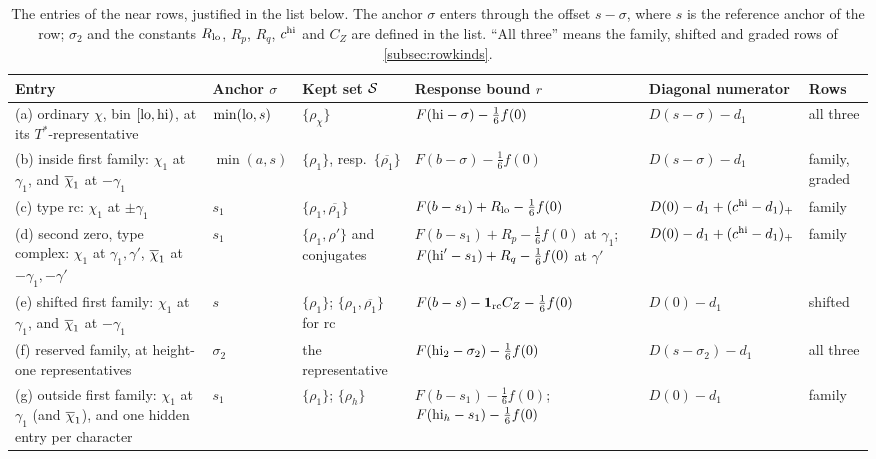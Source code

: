 \begin{table}[ht]
\centering
\footnotesize
\setlength{\tabcolsep}{3.5pt}
\renewcommand{\arraystretch}{1.3}
\begin{tabular}{@{}>{\raggedright\arraybackslash}p{3.45cm}>{\centering\arraybackslash}p{1.35cm}
  >{\centering\arraybackslash}p{1.75cm}>{\centering\arraybackslash}p{3.2cm}
  >{\centering\arraybackslash}p{2.35cm}>{\raggedright\arraybackslash}p{1.65cm}@{}}
\toprule
Entry & Anchor $\sigma$ & Kept set $\mathcal{S}$ & Response bound $r$ & Diagonal numerator & Rows\\
\midrule
(a) ordinary $\chi$, bin $[\mathrm{lo},\mathrm{hi})$, at its $T^*$-representative & $\min(\mathrm{lo},s)$ & $\{\rho_\chi\}$ &
  $F(\mathrm{hi}-\sigma)-\frac16f(0)$ & $D(s-\sigma)-d_1$ & all three\\
(b) inside first family: $\chi_1$ at $\gamma_1$, and $\overline{\chi}_1$ at $-\gamma_1$ & $\min(a,s)$ &
  $\{\rho_1\}$, resp.\ $\{\overline{\rho_1}\}$ & $F(b-\sigma)-\frac16f(0)$ & $D(s-\sigma)-d_1$ & family, graded\\
(c) type $\mathrm{rc}$: $\chi_1$ at $\pm\gamma_1$ & $s_1$ & $\{\rho_1,\overline{\rho_1}\}$ &
  $F(b-s_1)+R_{\mathrm{lo}}-\frac16f(0)$ & $D(0)-d_1+(c^{\mathrm{hi}}-d_1)_+$ & family\\
(d) second zero, type $\mathrm{complex}$: $\chi_1$ at $\gamma_1,\gamma'$, $\overline{\chi}_1$ at $-\gamma_1,-\gamma'$ &
  $s_1$ & $\{\rho_1,\rho'\}$ and conjugates & $F(b-s_1)+R_p-\frac16f(0)$ at $\gamma_1$;
  $F(\mathrm{hi}'-s_1)+R_q-\frac16f(0)$ at $\gamma'$ & $D(0)-d_1+(c^{\mathrm{hi}}-d_1)_+$ & family\\
(e) shifted first family: $\chi_1$ at $\gamma_1$, and $\overline{\chi}_1$ at $-\gamma_1$ & $s$ &
  $\{\rho_1\}$; $\{\rho_1,\overline{\rho_1}\}$ for $\mathrm{rc}$ & $F(b-s)-\mathbf{1}_{\mathrm{rc}}C_Z-\frac16f(0)$ &
  $D(0)-d_1$ & shifted\\
(f) reserved family, at height-one representatives & $\sigma_2$ & the representative &
  $F(\mathrm{hi}_2-\sigma_2)-\frac16f(0)$ & $D(s-\sigma_2)-d_1$ & all three\\
(g) outside first family: $\chi_1$ at $\gamma_1$ (and $\overline{\chi}_1$), and one hidden entry per character &
  $s_1$ & $\{\rho_1\}$; $\{\rho_h\}$ & $F(b-s_1)-\frac16f(0)$; $F(\mathrm{hi}_h-s_1)-\frac16f(0)$ & $D(0)-d_1$ &
  family\\
\bottomrule
\end{tabular}
\caption{The entries of the near rows, justified in the list below. The anchor $\sigma$ enters
through the offset $s-\sigma$, where $s$ is the reference anchor of the row; $\sigma_2$ and the
constants $R_{\mathrm{lo}}$, $R_p$, $R_q$, $c^{\mathrm{hi}}$ and $C_Z$ are defined in the list. ``All three'' means
the family, shifted and graded rows of \cref{subsec:rowkinds}.}
\label{tab:entries}
\end{table}

